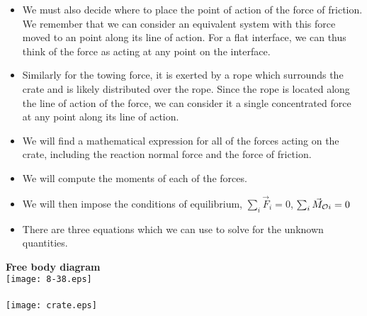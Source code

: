 \documentclass{seminar}
\begin{document}
\begin{slide}
\begin{itemize}
\item{}We must also decide where to place the point of action of the force of friction.  We
remember that we can consider an equivalent system with this force moved to an point along
its line of action.  For a flat interface, we can thus think of the force as acting at any point
on the interface.  
\item{}Similarly for the towing force, it is exerted by a rope which surrounds the crate and is
likely distributed over the rope.  Since the rope is located along the line of action
of the force, we can consider it a single concentrated force at any point along its line
of action. 
\item{}We will find a mathematical expression for all of the forces
acting on the crate, including the reaction normal force and the force
of friction.
\item{}We will compute the moments of each of the forces.
\end{itemize}
\vfill
\end{slide}

















\begin{slide}
\begin{itemize} 
\item{}We will then impose the conditions of equilibrium,
$
\sum_i \vec F_i=0$, $\sum_i \vec M_{{\cal O}i}=0$
\item{}There are three equations which we can use to solve for the unknown quantities. 
\end{itemize}
\vfill
\end{slide}






\begin{slide}
{\bf\blue Free body diagram}\\
\texttt{[image: 8-38.eps]}\\~~\\
\texttt{[image: crate.eps]}
\vfill
\end{slide}
\end{document}
